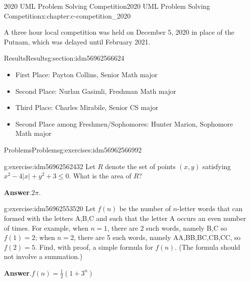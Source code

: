 \documentclass[twoside,10pt,]{book}
\newcommand{\blocktitlefont}{\relax}
\numberwithin{equation}{section}
\begin{document}
\begin{chapterptx}{2020 UML Problem Solving Competition}{}{2020 UML Problem Solving Competition}{}{}{x:chapter:c-competition_2020}
\begin{introduction}{}%
A three hour local competition was held on December 5, 2020 in place of the Putnam, which was delayed until February 2021.%
\end{introduction}%
%
%
\typeout{************************************************}
\typeout{************************************************}
%
\begin{sectionptx}{Results}{}{Results}{}{}{g:section:idm56962566624}
%
\begin{itemize}[label=\textbullet]
\item{}First Place:  Payton Collins, Senior Math major%
\item{}Second Place: Nurlan Gasimli, Freshman Math major%
\item{}Third Place: Charles Mirabile, Senior CS major%
\item{}Second Place among Freshmen\slash{}Sophomores:  Hunter Marion, Sophomore Math major%
\end{itemize}
%
\end{sectionptx}
%
%
\typeout{************************************************}
\typeout{************************************************}
%
\begin{exercises-section}{Problems}{}{Problems}{}{}{g:exercises:idm56962566992}
\begin{divisionexercise}{1}{}{}{g:exercise:idm56962562432}%
Let \(R\) denote the set of points \((x, y)\) satisfying \(x^2 - 4 \lvert x \rvert +y^2 + 3 \leq 0\). What is the area of \(R\)?%
\par\smallskip%
\noindent\textbf{\blocktitlefont Answer}.\hypertarget{g:answer:idm56962561168}{}\quad{}\(2\pi\).%
\end{divisionexercise}%
\begin{divisionexercise}{2}{}{}{g:exercise:idm56962553520}%
Let \(f(n)\) be the number of \(n\)-letter words that can formed with the letters A,B,C and such that the letter A occurs an even number of times. For example, when \(n = 1\), there are 2 such words, namely B,C so \(f (1) = 2\); when \(n = 2\), there are 5 such words, namely AA,BB,BC,CB,CC, so \(f(2) = 5\). Find, with proof, a simple formula for \(f(n)\). (The formula should not involve a summation.)%
\par\smallskip%
\noindent\textbf{\blocktitlefont Answer}.\hypertarget{g:answer:idm56962552880}{}\quad{}\(f(n)= \frac{1}{2} \left(1+3^n\right)\)%

\end{divisionexercise}
\end{exercises-section}
\end{chapterptx}
\end{document}
